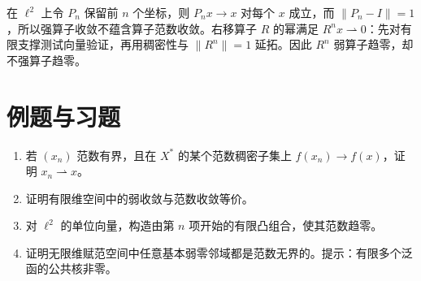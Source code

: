 在 $\ell^2$ 上令 $P_n$ 保留前 $n$ 个坐标，则 $P_nx\to x$ 对每个 $x$ 成立，而 $\|P_n-I\|=1$，所以强算子收敛不蕴含算子范数收敛。右移算子 $R$ 的幂满足 $R^nx\rightharpoonup0$：先对有限支撑测试向量验证，再用稠密性与 $\|R^n\|=1$ 延拓。因此 $R^n$ 弱算子趋零，却不强算子趋零。

\section{例题与习题}
\begin{enumerate}
 \item 若 $(x_n)$ 范数有界，且在 $X^*$ 的某个范数稠密子集上 $f(x_n)\to f(x)$，证明 $x_n\rightharpoonup x$。
 \item 证明有限维空间中的弱收敛与范数收敛等价。
 \item 对 $\ell^2$ 的单位向量，构造由第 $n$ 项开始的有限凸组合，使其范数趋零。
 \item 证明无限维赋范空间中任意基本弱零邻域都是范数无界的。提示：有限多个泛函的公共核非零。
\end{enumerate}

